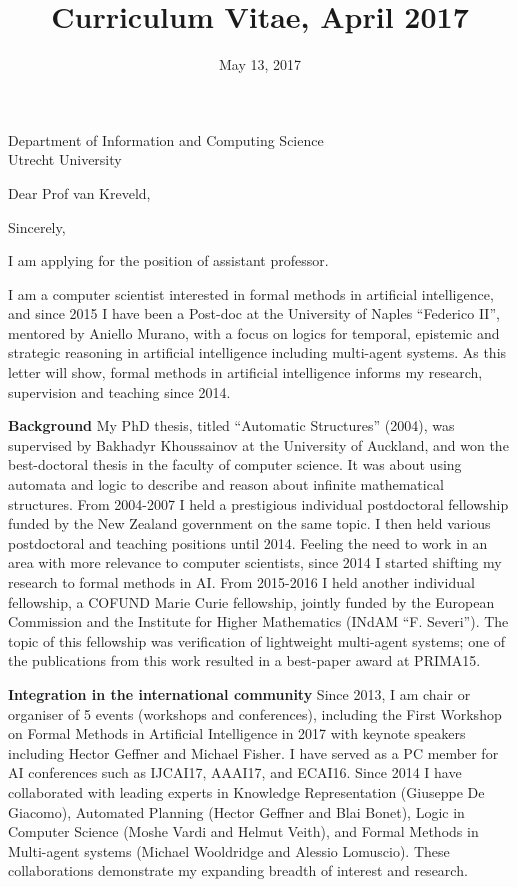 \documentclass[10.5pt,a4paper,sans]{moderncv}
\title{Curriculum Vitae, April 2017}                               %
\begin{document}
{Department of Information and Computing Science\\
Utrecht University}
\date{May 13, 2017}
\opening{Dear Prof van Kreveld,}
\closing{Sincerely,\vspace{-1cm}}
\makelettertitle




I am applying for the position of assistant professor.

I am a computer scientist interested in formal methods in artificial intelligence, and since 2015 I have been a Post-doc at the University of Naples ``Federico II'', mentored by Aniello Murano, with a focus on logics for temporal, epistemic and strategic reasoning in artificial intelligence including  multi-agent systems. As this letter will show, formal methods in artificial intelligence informs my research, supervision and teaching since 2014.

\textbf{Background}
My PhD thesis, titled ``Automatic Structures'' (2004), was supervised by Bakhadyr Khoussainov at the University of Auckland, and won the best-doctoral thesis in the faculty of computer science. It was about using automata and logic to describe and reason about infinite 
mathematical structures. From 2004-2007 I held a prestigious individual postdoctoral fellowship funded by the New Zealand government on the same topic. I then held various postdoctoral and teaching positions until 2014. Feeling the need to work in an area with more relevance to computer scientists, since 2014 I started shifting my research to formal methods in AI. From 2015-2016 I held another individual fellowship, a COFUND Marie Curie fellowship, 
jointly funded by the European Commission and the Institute for Higher Mathematics (INdAM ``F. Severi''). The topic of this fellowship was verification of lightweight multi-agent systems; one of the publications from this work resulted in a best-paper award at PRIMA15. 

\textbf{Integration in the international community}
Since 2013, I am chair or organiser of 5 events (workshops and conferences), including the First Workshop on Formal Methods in Artificial Intelligence in 2017 with keynote speakers including Hector Geffner and Michael Fisher. I have served 
as a PC member for AI conferences such as IJCAI17, AAAI17, and ECAI16. Since 2014 I have collaborated with leading experts in Knowledge Representation (Giuseppe De Giacomo), Automated Planning (Hector Geffner and Blai Bonet), Logic in Computer Science (Moshe Vardi and Helmut Veith), and Formal Methods in Multi-agent systems (Michael Wooldridge and Alessio Lomuscio). These collaborations demonstrate my expanding breadth of interest and research.
\end{document}
